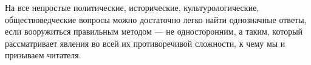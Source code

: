 На все непростые политические, исторические, культурологические,
обществоведческие вопросы можно достаточно легко найти однозначные ответы, если
вооружиться правильным методом — не односторонним, а таким, который
рассматривает явления во всей их противоречивой сложности, к чему мы и
призываем читателя.

